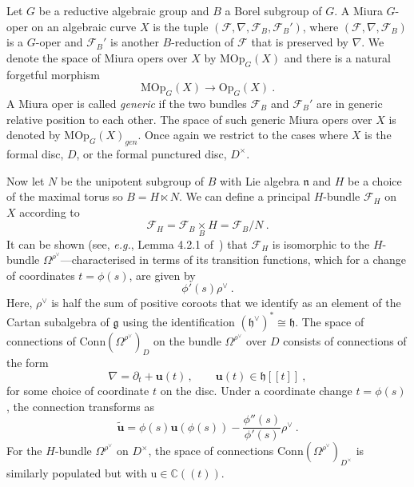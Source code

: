 \documentclass[a4paper]{article}
\def\IC{\mathbb{C}}
\def\gf{\mathfrak{g}}
\def \eg{{\it e.g.}}
\def \MOp{\mathrm{MOp}}
\begin{document}
Let $G$ be a reductive algebraic group and $B$ a Borel subgroup of $G$. A Miura $G$-oper on an algebraic curve $X$ is the tuple $(\mathscr{F},\nabla,\mathscr{F}_B,\mathscr{F}_B')$, where $(\mathscr{F},\nabla,\mathscr{F}_B)$ is a $G$-oper and $\mathscr{F}_B'$ is another $B$-reduction of $\mathscr{F}$ that is preserved by $\nabla$. We denote the space of Miura opers over $X$ by $\mathrm{MOp}_G(X)$ and there is a natural forgetful morphism
\begin{equation}\label{eq:miura_forget}
	\MOp_G(X) \rightarrow \mathrm{Op}_G(X)~.
\end{equation}
A Miura oper is called \textit{generic} if the two bundles $\mathscr{F}_B$ and $\mathscr{F}_B'$ are in generic relative position to each other. The space of such generic Miura opers over $X$ is denoted by $\MOp_{G}(X)_{gen}$. Once again we restrict to the cases where $X$ is the formal disc, $D$, or the formal punctured disc, $D^\times$.

Now let $N$ be the unipotent subgroup of $B$ with Lie algebra $\mathfrak{n}$ and $H$ be a choice of the maximal torus so $B=H\ltimes N$. We can define a principal $H$-bundle $\mathscr{F}_H$ on $X$ according to
\begin{equation}
	\mathscr{F}_H = \mathscr{F}_B \underset{B}\times H = \mathscr{F}_B/N~.
\end{equation}
It can be shown (see, \eg, Lemma 4.2.1 of~\cite{Frenkel:2007}) that $\mathscr{F}_H$ is isomorphic to the $H$-bundle $\Omega^{\rho^\vee}$---characterised in terms of its transition functions, which for a change of coordinates $t=\phi(s)$, are given by
\begin{equation}
	\phi'(s)\rho^\vee~.
\end{equation}
Here, $\rho^\vee$ is half the sum of positive coroots that we identify as an element of the Cartan subalgebra of $\gf$ using the identification $(\mathfrak{h}^\vee)^* \cong \mathfrak{h}$. The space of connections of $\mathrm{Conn}(\Omega^{\rho^\vee})_D$ on the bundle $\Omega^{\rho^\vee}$ over $D$ consists of connections of the form
\begin{equation}
	\nabla = \partial_t + \mathbf{u}(t)\,,\qquad \mathbf{u}(t)\in\mathfrak{h}[\![t]\!]~,
\end{equation}
for some choice of coordinate $t$ on the disc. Under a coordinate change $t=\phi(s)$, the connection transforms as
\begin{equation}\label{eq:cartan_coord_transform}
	\tilde{\mathbf{u}} = \phi(s)\mathbf{u}(\phi(s)) - \frac{\phi''(s)}{\phi'(s)}\rho^\vee~.
\end{equation}
For the $H$-bundle $\Omega^{\rho^\vee}$ on $D^\times$, the space of connections $\mathrm{Conn}(\Omega^{\rho^\vee})_{D^\times}$ is similarly populated but with $\mathrm{u}\in \IC(\!(t)\!)$.
\end{document}
